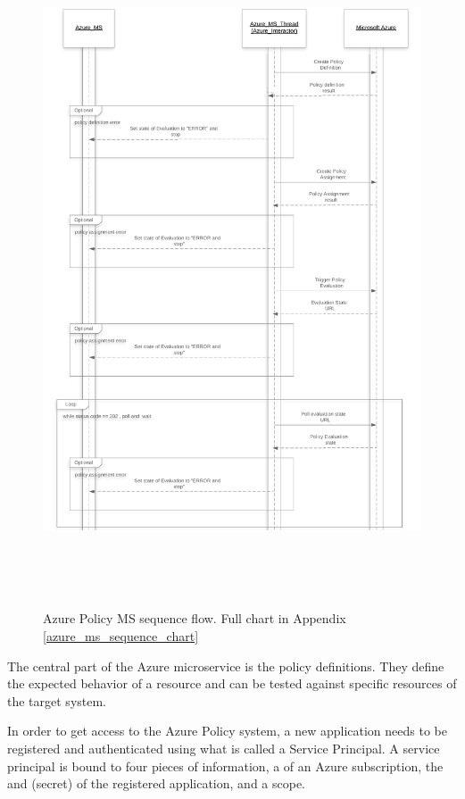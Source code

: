 \newpage

\begin{figure}[ht!]
\begin{center}
\includegraphics[height=20cm]{Azure_MS_Sequence_cropped.png}
\end{center}
\caption[Azure Policy MS sequence flow]{Azure Policy MS sequence flow. Full chart in Appendix \ref{azure_ms_sequence_chart}}
\end{figure}

\vskip 1cm

The central part of the Azure microservice is the policy definitions. They define the expected behavior of a resource and can be tested against specific resources of the target system.

In order to get access to the Azure Policy system, a new application needs to be registered and authenticated using what is called a Service Principal. A service principal is bound to four pieces of information, a  of an Azure subscription, the  and  (secret) of the registered application, and a  scope.

